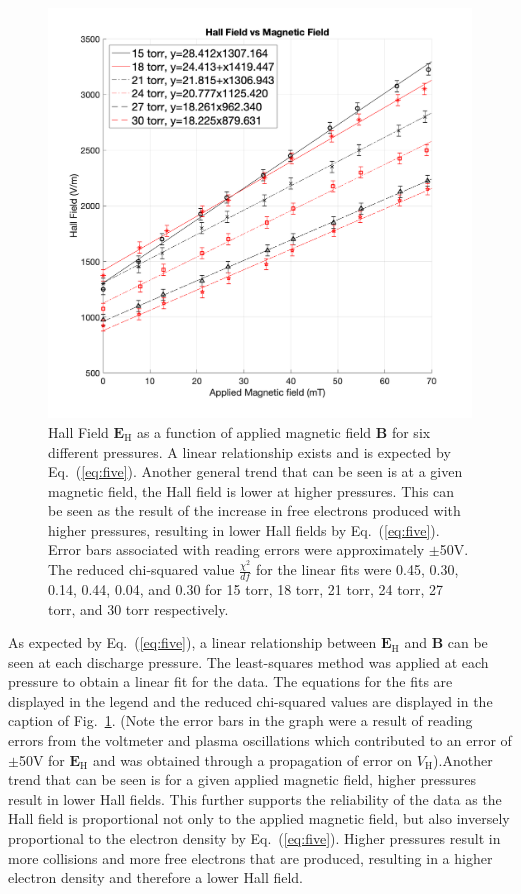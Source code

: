 \documentclass[%
 aip,
rsi,%
 amsmath,amssymb,
 reprint,%
author-numerical,%
]{revtex4-1}
\begin{document}
\begin{figure}[H]
\includegraphics[width=1\linewidth]{lateximages/HallField.png} 
\caption{\label{fig:HallField}  Hall Field $\boldsymbol { E } _ { \mathrm { H } }$ as a function of applied magnetic field $\boldsymbol { B }$ for six different pressures. A linear relationship exists and is expected by Eq.~(\ref{eq:five}). Another general trend that can be seen is at a given magnetic field, the Hall field is lower at higher pressures. This can be seen as the result of the increase in free electrons produced with higher pressures, resulting in lower Hall fields by Eq.~(\ref{eq:five}). Error bars associated with reading errors were approximately $\pm$50V. The reduced chi-squared value $\frac{\chi^{2}}{df}$ for the linear fits were 0.45, 0.30, 0.14, 0.44, 0.04, and 0.30 for 15 torr, 18 torr, 21 torr, 24 torr, 27 torr, and 30 torr respectively.}
\end{figure}

As expected by Eq.~(\ref{eq:five}), a linear relationship between $\boldsymbol { E } _ { \mathrm { H } }$ and $\boldsymbol { B }$ can be seen at each discharge pressure. The least-squares method was applied at each pressure to obtain a linear fit for the data. The equations for the fits are displayed in the legend and the reduced chi-squared values are displayed in the caption of Fig.~\ref{fig:HallField}. (Note the error bars in the graph were a result of reading errors from the voltmeter and plasma oscillations which contributed to an error of $\pm$50V for $\boldsymbol { E } _ { \mathrm { H } }$ and was obtained through a propagation of error on $V _ { \mathrm { H } }$).Another trend that can be seen is for a given applied magnetic field, higher pressures result in lower Hall fields. This further supports the reliability of the data as the Hall field is proportional not only to the applied magnetic field, but also inversely proportional to the electron density by Eq.~(\ref{eq:five}). Higher pressures result in more collisions and more free electrons that are produced, resulting in a higher electron density and therefore a lower Hall field.
\end{document}

